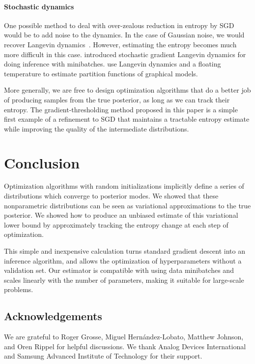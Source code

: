 \documentclass[]{article}
\begin{document}
\paragraph{Stochastic dynamics}
One possible method to deal with over-zealous reduction in entropy by SGD would be to add noise to the dynamics.
In the case of Gaussian noise, we would recover Langevin dynamics~\citep{neal2011mcmc}.
However, estimating the entropy becomes much more difficult in this case.
\citet{welling2011bayesian} introduced stochastic gradient Langevin dynamics for doing inference with minibatches.
\citet{ma2013estimating} use Langevin dynamics and a floating temperature to estimate partition functions of graphical models.

More generally, we are free to design optimization algorithms that do a better job of producing samples from the true posterior, as long as we can track their entropy.
The gradient-thresholding method proposed in this paper is a simple first example of a refinement to SGD that maintains a tractable entropy estimate while improving the quality of the intermediate distributions.

\section{Conclusion}

Optimization algorithms with random initializations implicitly define a series of distributions which converge to posterior modes.
We showed that these nonparametric distributions can be seen as variational approximations to the true posterior. %
We showed how to produce an unbiased estimate of this variational lower bound by approximately tracking the entropy change at each step of optimization.

This simple and inexpensive calculation turns standard gradient descent into an inference algorithm, and allows the optimization of hyperparameters without a validation set.
Our estimator is compatible with using data minibatches and scales linearly with the number of parameters, making it suitable for large-scale problems.

\subsection{Acknowledgements}
We are grateful to Roger Grosse, Miguel Hern\'andez-Lobato, Matthew Johnson, and Oren Rippel for helpful discussions.
We thank Analog Devices International and Samsung Advanced Institute of Technology for their support.



\end{document}
